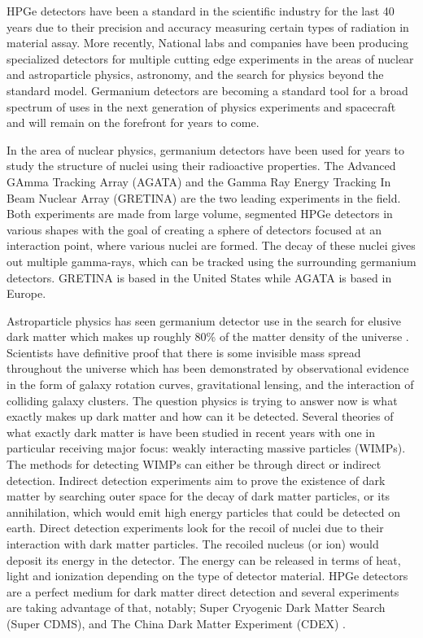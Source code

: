 HPGe detectors have been a standard in the scientific industry for the last 40 years due to their precision and accuracy measuring certain types of radiation in material assay.
More recently, National labs and companies have been producing specialized detectors for multiple cutting edge experiments in the areas of nuclear and astroparticle physics, astronomy, and the search for physics beyond the standard model.
Germanium detectors are becoming a standard tool for a broad spectrum of uses in the next generation of physics experiments and spacecraft and will remain on the forefront for years to come.

In the area of nuclear physics, germanium detectors have been used for years to study the structure of nuclei using their radioactive properties.
The Advanced GAmma Tracking Array (AGATA)\cite{agata} and the Gamma Ray Energy Tracking In Beam Nuclear Array (GRETINA)\cite{gretina} are the two leading experiments in the field.
Both experiments are made from large volume, segmented HPGe detectors in various shapes with the goal of creating a sphere of detectors focused at an interaction point, where various nuclei are formed. The decay of these nuclei gives out multiple gamma-rays, which can be tracked using the surrounding germanium detectors.
GRETINA is based in the United States while AGATA is based in Europe.

Astroparticle physics has seen germanium detector use in the search for elusive dark matter which makes up roughly 80\% of the matter density of the universe \cite{cdms}.
Scientists have definitive proof that there is some invisible mass spread throughout the universe which has been demonstrated by observational evidence in the form of galaxy rotation curves, gravitational lensing, and the interaction of colliding galaxy clusters.
The question physics is trying to answer now is what exactly makes up dark matter and how can it be detected.
Several theories of what exactly dark matter is have been studied in recent years with one in particular receiving major focus: weakly interacting massive particles (WIMPs).
The methods for detecting WIMPs can either be through direct or indirect detection.
Indirect detection experiments aim to prove the existence of dark matter by searching outer space for the decay of dark matter particles, or its annihilation, which would emit high energy particles that could be detected on earth.
Direct detection experiments look for the recoil of nuclei due to their interaction with dark matter particles.
The recoiled nucleus (or ion) would deposit its energy in the detector. The energy can be released in terms of heat, light and ionization depending on the type of detector material.
HPGe detectors are a perfect medium for dark matter direct detection and several experiments are taking advantage of that, notably; Super Cryogenic Dark Matter Search (Super CDMS)\cite{cdms}, and The China Dark Matter Experiment (CDEX) \cite{cdex}.

